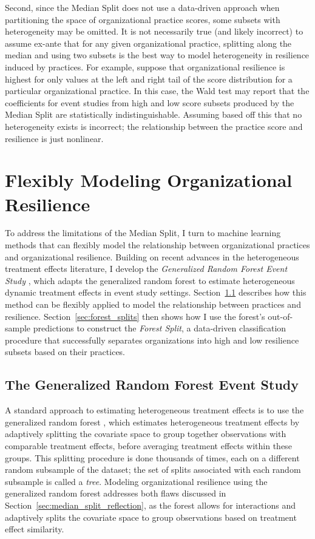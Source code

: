 \documentclass[12pt,notitlepage]{article}
\begin{document}
Second, since the Median Split does not use a data-driven approach when partitioning the space of organizational  practice scores, some subsets with heterogeneity may be omitted. 
It is not necessarily true (and likely incorrect) to assume ex-ante that for any given organizational practice, splitting along the median and using two subsets is the best way to model heterogeneity in resilience induced by practices. 
For example, suppose that organizational resilience is highest for only values at the left and right tail of the score distribution for a particular organizational practice. 
In this case, the Wald test may report that the coefficients for event studies from high and low score subsets produced by the Median Split are statistically indistinguishable.
Assuming based off this that no heterogeneity exists is incorrect; the relationship between the practice score and resilience is just nonlinear. 

\section{Flexibly Modeling Organizational Resilience} \label{sec:org_resilience_forest}
To address the limitations of the Median Split, I turn to machine learning methods that can flexibly model the relationship between organizational practices and organizational resilience.
Building on recent advances in the heterogeneous treatment effects literature, I develop the \textit{Generalized Random Forest Event Study} \citep{liao_generalized_2025}, which adapts the generalized random forest \citep{athey_generalized_2019} to estimate heterogeneous dynamic treatment effects in event study settings.
Section~\ref{sec:grf_es} describes how this method can be flexibly applied to model the relationship between practices and resilience. 
Section~\ref{sec:forest_splits} then shows how I use the forest's out-of-sample predictions to construct the \textit{Forest Split}, a data-driven classification procedure that successfully separates organizations into high and low resilience subsets based on their practices.

\subsection{The Generalized Random Forest Event Study} \label{sec:grf_es}
A standard approach to estimating heterogeneous treatment effects is to use the generalized random forest \citep{athey_generalized_2019}, which estimates heterogeneous treatment effects by adaptively splitting the covariate space to group together observations with comparable treatment effects, before averaging treatment effects within these groups.
This splitting procedure is done thousands of times, each on a different random subsample of the dataset; the set of splits associated with each random subsample is called a \textit{tree}. 
Modeling organizational resilience using the generalized random forest addresses both flaws discussed in Section~\ref{sec:median_split_reflection}, as the forest allows for interactions and adaptively splits the covariate space to group observations based on treatment effect similarity.
\end{document}
